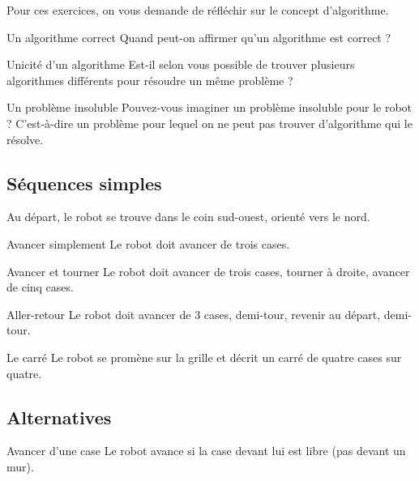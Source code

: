 		Pour ces exercices, on vous demande de réfléchir sur le concept
		d'algorithme.

		\begin{Exercice}{Un algorithme correct}
			Quand peut-on affirmer qu'un algorithme est correct ?
		\end{Exercice}

		\begin{Exercice}{Unicité d'un algorithme}
			Est-il selon vous possible de trouver 
			plusieurs algorithmes différents
			pour résoudre un même problème ?
		\end{Exercice}

		\begin{Exercice}{Un problème insoluble}
			Pouvez-vous imaginer un problème insoluble pour le robot ?
			C'est-à-dire un problème pour lequel on ne peut pas
			trouver d'algorithme qui le résolve.
		\end{Exercice}

	\subsection{Séquences simples}

		Au départ, le robot se trouve dans le coin sud-ouest, 
		orienté vers le nord.

		\begin{Exercice}{Avancer simplement}
			Le robot doit avancer de trois cases.
		\end{Exercice}

		\begin{Exercice}{Avancer et tourner}
			Le robot doit avancer de trois cases, tourner à droite, 
			avancer de cinq cases.
		\end{Exercice}

		\begin{Exercice}{Aller-retour}
			Le robot doit avancer de 3 cases, demi-tour, 
			revenir au départ, demi-tour.
		\end{Exercice}

		\begin{Exercice}{Le carré}
			Le robot se promène sur la grille 
			et décrit un carré de quatre cases sur quatre.
		\end{Exercice}
		
	\subsection{Alternatives}

		\begin{Exercice}{Avancer d'une case}
			Le robot avance si la case devant lui est libre (pas devant un mur).
		\end{Exercice}

